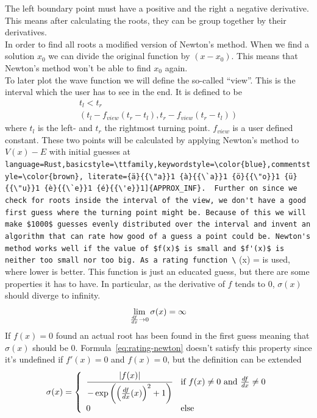 \documentclass[11pt,DIV=10,final]{scrreprt} %
\providecommand{\rustinline}{\lstinline[language=Rust,basicstyle=\ttfamily,keywordstyle=\color{blue},commentstyle=\color{brown}, literate={ä}{{\"a}}1 {à}{{\`a}}1 {ö}{{\"o}}1 {ü}{{\"u}}1 {è}{{\`e}}1 {é}{{\'e}}1]} % für Inline-C++ Code
\newcommand{\deriv}[2]{%
  \frac{d#1}{d#2}
}
\begin{document}
The left boundary point must have a positive and the right a negative derivative. This means  after calculating the roots, they can be group together by their derivatives.
\\
In order to find all roots a modified version of Newton's method. When we find a solution $x_{0}$ we can divide the original function by $(x - x_{0})$. This means that Newton's method won't be able to find $x_{0}$ again.
\\
\label{sec:view}
To later plot the wave function we will define the so-called ``view''. This is the interval which the user has to see in the end.
It is defined to be
\begin{align*}
  t_{l} < t_{r} \\
  \left(t_{l} - f_{view} (t_{r} - t_{l}), t_{r} - f_{view} (t_{r} - t_{l})\right)
\end{align*}
where $t_{l}$ is the left- and $t_{r}$ the rightmost turning point. $f_{view}$ is a user defined constant.
These two points will be calculated by applying Newton's method to $V(x) - E$ with initial guesses at \rustinline{APPROX_INF}.

Further on since we check for roots inside the interval of the view, we don't
have a good first guess where the turning point might be. Because of this we will make $1000$
guesses evenly distributed over the interval and invent an algorithm that can rate how good of a guess a point could be.
Newton's method works well if the value of $f(x)$ is small and $f'(x)$ is neither too small nor too big.
As a rating function
\[
  \label{eq:rating-newton}
  \sigma(x) = \cfrac{|f(x)| }{ -\exp\left({{\left(\deriv{f}{x}(x)\right)}^{2} + 1}\right)}
\]
is used, where lower is better. This function is just an educated guess, but there are some properties it has to have. In particular, as the derivative of $f$ tends to 0, $\sigma(x)$ should diverge to infinity.
\[\lim_{\deriv{f}{x} \to 0} \sigma(x) = \infty\]
If $f(x) = 0$ found an actual root has been found in the first guess meaning that $\sigma(x)$
should be 0. Formula~\ref{eq:rating-newton} doesn't satisfy this property since it's
undefined if $f'(x) = 0$ and $f(x) = 0$, but the definition can be extended
\[
  \sigma(x) = \left\{
    \begin{array}{ll}
    \cfrac{|f(x)| }{ -\exp\left({{\left(\deriv{f}{x}(x)\right)}^{2} + 1}\right)} & \text{if} ~f(x) \ne 0~\text{and}~\deriv{f}{x} \ne 0 \\
    0 & \text{else}
    \end{array}\right.
\]
\end{document}
